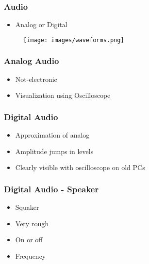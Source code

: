 \begin{frame}
\frametitle{Audio}

\begin{itemize}
\item Analog or Digital
\end{itemize}

\begin{figure}
\texttt{[image: images/waveforms.png]}
\end{figure}

\end{frame}


\begin{frame}
\frametitle{Analog Audio}

\begin{itemize}
\item Not-electronic
\item Visualization using Oscilloscope
\end{itemize}

\end{frame}


\begin{frame}
\frametitle{Digital Audio}

\begin{itemize}
\item Approximation of analog
\item Amplitude jumps in levels
\item Clearly visible with oscilloscope on old PCs
\end{itemize}

\end{frame}


\begin{frame}
\frametitle{Digital Audio - Speaker}

\begin{itemize}
\item Squaker
\item Very rough
\item On or off
\item Frequency
\end{itemize}

\end{frame}

